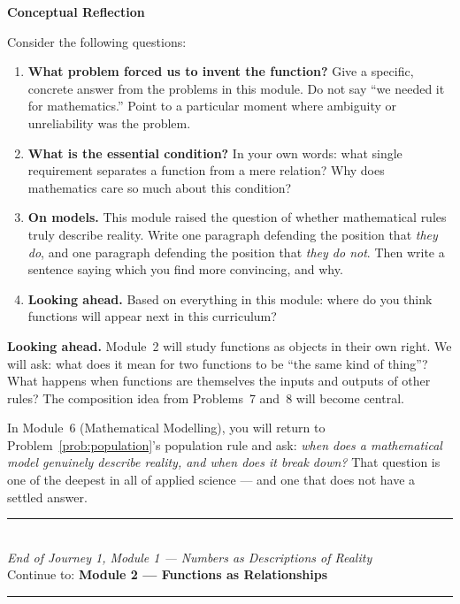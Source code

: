 \documentclass[12pt, a4paper]{article}
\newcounter{problem}
\begin{document}
\begin{reflectionbox}
\textbf{Conceptual Reflection}

Consider the following questions:


\begin{enumerate}
  \item \textbf{What problem forced us to invent the function?} Give a specific, concrete answer from the problems in this module. Do not say ``we needed it for mathematics.'' Point to a particular moment where ambiguity or unreliability was the problem.

  \item \textbf{What is the essential condition?} In your own words: what single requirement separates a function from a mere relation? Why does mathematics care so much about this condition?

  \item \textbf{On models.} This module raised the question of whether mathematical rules truly describe reality. Write one paragraph defending the position that \emph{they do}, and one paragraph defending the position that \emph{they do not}. Then write a sentence saying which you find more convincing, and why.

  \item \textbf{Looking ahead.} Based on everything in this module: where do you think functions will appear next in this curriculum?
\end{enumerate}
\end{reflectionbox}

\medskip
\noindent\textbf{Looking ahead.}
Module~2 will study functions as objects in their own right. We will ask: what does it mean for two functions to be ``the same kind of thing''? What happens when functions are themselves the inputs and outputs of other rules? The composition idea from Problems~7 and~8 will become central.

In Module~6 (Mathematical Modelling), you will return to Problem~\ref{prob:population}'s population rule and ask: \textit{when does a mathematical model genuinely describe reality, and when does it break down?} That question is one of the deepest in all of applied science --- and one that does not have a settled answer.

\vspace{1.4cm}
\begin{center}
{\color{MidBlue}\rule{0.5\linewidth}{0.8pt}}\\[6pt]
{\small\color{DarkGrey}\textit{End of Journey 1, Module 1 --- Numbers as Descriptions of Reality}}\\[4pt]
{\small\color{DarkGrey}Continue to: \textbf{Module 2 --- Functions as Relationships}}\\[6pt]
{\color{MidBlue}\rule{0.5\linewidth}{0.8pt}}
\end{center}
\end{document}
